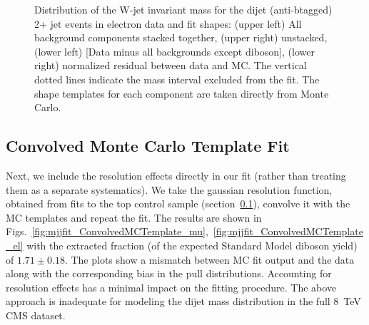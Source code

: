 \begin{figure}[h!]
{    \caption{Distribution of the W-jet invariant mass for the dijet (anti-btagged) 2+ jet events in electron data and fit shapes: 
      (upper left) All background components stacked together, 
      (upper right) unstacked, (lower left) [Data minus all backgrounds except diboson],  
      (lower right) normalized residual between data and MC. The vertical dotted lines
      indicate the mass interval excluded from the fit. The shape templates for each component are taken directly from Monte Carlo.}
    \label{fig:mjjfit_MCTemplate_el}}
\end{figure}


\subsection{Convolved Monte Carlo Template Fit}
\label{sec:convolvedMCfit}

Next, we include the resolution effects directly in our fit (rather than treating them as a separate systematics). We take the gaussian resolution function, obtained from fits to the top control sample (section~\ref{sec:convolvedMCfit}), convolve it with the MC templates and repeat the fit. The results are shown in Figs.~\ref{fig:mjjfit_ConvolvedMCTemplate_mu},~\ref{fig:mjjfit_ConvolvedMCTemplate_el} with the extracted fraction (of the expected Standard Model diboson yield) of $1.71\pm 0.18$. The plots show a mismatch between MC fit output and the data along with the corresponding bias in the pull distributions. Accounting for resolution effects has a minimal impact on the fitting procedure. The above approach is inadequate for modeling the dijet mass distribution in the full 8~TeV CMS dataset.

